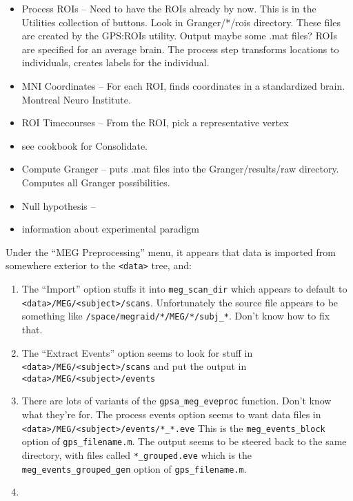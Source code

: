\documentclass[11pt]{article}
\begin{document}
\begin{itemize}

\item Process ROIs --  Need to have the ROIs already by now.
  This is in the Utilities collection of buttons.  Look in
  Granger/*/rois directory.  These files are created by the GPS:ROIs
  utility.  Output maybe some .mat files?  ROIs are specified for an
  average brain.  The process step transforms locations to
  individuals, creates labels for the individual.

\item MNI Coordinates -- For each ROI, finds coordinates in a
  standardized brain.  Montreal Neuro Institute.

\item ROI Timecourses -- From the ROI, pick a representative vertex

\item see cookbook for Consolidate.

\item Compute Granger -- puts .mat files into the Granger/results/raw
  directory.  Computes all Granger possibilities.

\item Null hypothesis --




\item information about experimental paradigm

\end{itemize}






Under the ``MEG Preprocessing'' menu, it appears that data is imported
from somewhere exterior to the \verb+<data>+ tree, and:

\begin{enumerate}

\item The ``Import'' option
stuffs it into \verb+meg_scan_dir+ which appears to default to
\verb+<data>/MEG/<subject>/scans+.  Unfortunately the source file
appears to be something like \verb+/space/megraid/*/MEG/*/subj_*+.
Don't know how to fix that.

\item The ``Extract Events'' option seems to look for stuff in
  \verb+<data>/MEG/<subject>/scans+ and put the output in
  \verb+<data>/MEG/<subject>/events+

\item There are lots of variants of the \verb+gpsa_meg_eveproc+
  function.  Don't know what they're for.  The process events option
  seems to want data files in
  \verb+<data>/MEG/<subject>/events/*_*.eve+  This is the
  \verb+meg_events_block+ option of \verb+gps_filename.m+.  The output
  seems to be steered back to the same directory, with files called
  \verb+*_grouped.eve+ which is the \verb+meg_events_grouped_gen+
  option of \verb+gps_filename.m+.

\item

\end{enumerate}
\end{document}
